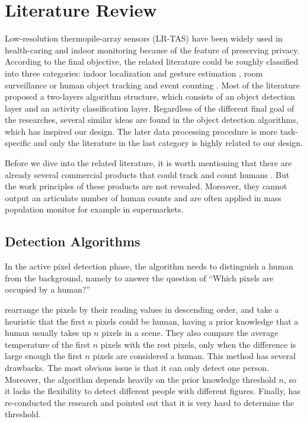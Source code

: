 \chapter{Literature Review} \label{ch:review}
Low-resolution thermopile-array sensors (LR-TAS) have been widely used in health-caring and indoor monitoring because of the feature of preserving privacy. According to the final objective, the related literature could be roughly classified into three categories: indoor localization and gesture estimation \cite{multi,karayaneva2018use,jeong2014probabilistic},
room surveillance \cite{gonzalez2013using,thermosense,basu2015tracking,IRTAS16x4}
or human object tracking and event counting \cite{mika,firstflow,melexis,virtualtrack}.
Most of the literature proposed a two-layers algorithm structure, which consists of an object detection layer and an activity classification layer. Regardless of the different final goal of the researches, several similar ideas are found in the object detection algorithms, which has inspired our design. The later data processing procedure is more task-specific and only the literature in the last category is highly related to our design.

Before we dive into the related literature, it is worth mentioning that there are already several commercial products that could track and count humans \cite{irisys,flir}. But the work principles of these products are not revealed. Moreover, they cannot output an articulate number of human counts and are often applied in mass population monitor for example in supermarkets.

\section{Detection Algorithms}
In the active pixel detection phase, the algorithm needs to distinguish a human from the background, namely to answer the question of ``Which pixels are occupied by a human?''

\citeauthor{mashiyama2015activity} \cite{mashiyama2015activity} rearrange the pixels by their reading values in descending order, and take a heuristic that the first $n$ pixels could be human, having a prior knowledge that a human usually takes up $n$ pixels in a scene. They also compare the average temperature of the first $n$ pixels with the rest pixels, only when the difference is large enough the first $n$ pixels are considered a human. This method has several drawbacks. The most obvious issue is that it can only detect one person. Moreover, the algorithm depends heavily on the prior knowledge threshold $n$, so it lacks the flexibility to detect different people with different figures. Finally, \citeauthor{trofimova2017indoor} \cite{trofimova2017indoor} has re-conducted the research and pointed out that it is very hard to determine the threshold.

